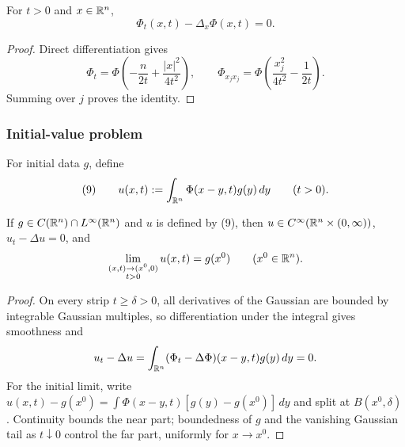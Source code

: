 \begin{lemma}
\label{lem:heat-kernel-solves-heat-equation}





For $t>0$ and $x\in\mathbb{R}^n$,
$$\Phi_t(x,t)-\Delta_x\Phi(x,t)=0.$$
\end{lemma}
\begin{proof}

\sketch Direct differentiation gives
$$\Phi_t=\Phi\left(-\frac n{2t}+\frac{|x|^2}{4t^2}\right),
\qquad
\Phi_{x_jx_j}=\Phi\left(\frac{x_j^2}{4t^2}-\frac1{2t}\right).$$
Summing over $j$ proves the identity.
\end{proof}

\subsubsection{Initial-value problem}
\label{sec:heat-initial-value-problem}

For initial data $g$, define
$$(9)\qquad
u(x,t):=\int_{\mathbb{R}^n}\Phi(x-y,t)g(y)\,dy
\qquad(t>0).$$

\begin{theorem}
\label{thm:heat-equation-initial-value-solution}

If $g\in C(\mathbb{R}^n)\cap L^\infty(\mathbb{R}^n)$ and $u$ is defined by (9), then
$u\in C^\infty(\mathbb{R}^n\times(0,\infty))$, $u_t-\Delta u=0$, and
$$\lim_{\substack{(x,t)\to(x^0,0)\\t>0}}u(x,t)=g(x^0)
\qquad(x^0\in\mathbb{R}^n).$$
\end{theorem}
\begin{proof}
\sketch On every strip $t\ge\delta>0$, all derivatives of the Gaussian are
bounded by integrable Gaussian multiples, so differentiation under the
integral gives smoothness and
$$u_t-\Delta u=\int_{\mathbb{R}^n}(\Phi_t-\Delta\Phi)(x-y,t)g(y)\,dy=0.$$
For the initial limit, write
$u(x,t)-g(x^0)=\int\Phi(x-y,t)[g(y)-g(x^0)]\,dy$ and split at
$B(x^0,\delta)$. Continuity bounds the near part; boundedness of $g$ and the
vanishing Gaussian tail as $t\downarrow0$ control the far part, uniformly for
$x\to x^0$.
\end{proof}

